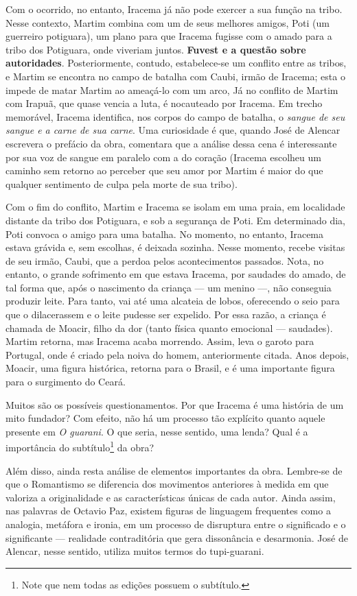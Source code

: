\documentclass[12pt]{book}
\begin{document}
				\par Com o ocorrido, no entanto, Iracema já não pode exercer a sua função na tribo. Nesse contexto, Martim combina com um de seus melhores amigos, Poti (um guerreiro potiguara), um plano para que Iracema fugisse com o amado para a tribo dos Potiguara, onde viveriam juntos. \textbf{Fuvest e a questão sobre autoridades}. Posteriormente, contudo, estabelece-se um conflito entre as tribos, e Martim se encontra no campo de batalha com Caubi, irmão de Iracema; esta o impede de matar Martim ao ameaçá-lo com um arco, Já no conflito de Martim com Irapuã, que quase vencia a luta, é nocauteado por Iracema. Em trecho memorável, Iracema identifica, nos corpos do campo de batalha, o \textit{sangue de seu sangue e a carne de sua carne}. Uma curiosidade é que, quando José de Alencar escrevera o prefácio da obra, comentara que a análise dessa cena é interessante por sua voz de sangue em paralelo com a do coração (Iracema escolheu um caminho sem retorno ao perceber que seu amor por Martim é maior do que qualquer sentimento de culpa pela morte de sua tribo).
				\par Com o fim do conflito, Martim e Iracema se isolam em uma praia, em localidade distante da tribo dos Potiguara, e sob a segurança de Poti. Em determinado dia, Poti convoca o amigo para uma batalha. No momento, no entanto, Iracema estava grávida e, sem escolhas, é deixada sozinha. Nesse momento, recebe visitas de seu irmão, Caubi, que a perdoa pelos acontecimentos passados. Nota, no entanto, o grande sofrimento em que estava Iracema, por saudades do amado, de tal forma que, após o nascimento da criança — um menino —, não conseguia produzir leite. Para tanto, vai até uma alcateia de lobos, oferecendo o seio para que o dilacerassem e o leite pudesse ser expelido. Por essa razão, a criança é chamada de Moacir, filho da dor (tanto física quanto emocional — saudades). Martim retorna, mas Iracema acaba morrendo. Assim, leva o garoto para Portugal, onde é criado pela noiva do homem, anteriormente citada. Anos depois, Moacir, uma figura histórica, retorna para o Brasil, e é uma importante figura para o surgimento do Ceará.
				\par Muitos são os possíveis questionamentos. Por que Iracema é uma história de um mito fundador? Com efeito, não há um processo tão explícito quanto aquele presente em \textit{O guarani}. O que seria, nesse sentido, uma lenda? Qual é a importância do subtítulo\footnote{Note que nem todas as edições possuem o subtítulo.} da obra?
				\par Além disso, ainda resta análise de elementos importantes da obra. Lembre-se de que o Romantismo se diferencia dos movimentos anteriores à medida em que valoriza a originalidade e as características únicas de cada autor. Ainda assim, nas palavras de Octavio Paz, existem figuras de linguagem frequentes como a analogia, metáfora e ironia, em um processo de disruptura entre o significado e o significante — realidade contraditória que gera dissonância e desarmonia. José de Alencar, nesse sentido, utiliza muitos termos do tupi-guarani.
\end{document}

